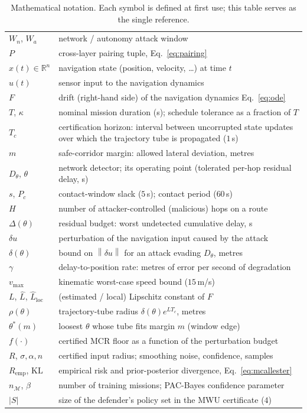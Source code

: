 \documentclass[conference,letterpaper,10pt]{IEEEtran}   %
\newcommand{\Real}{\mathbb{R}}
\newcommand{\Norm}[1]{\left\lVert #1\right\rVert}
\begin{document}
\begin{table}[t]
\centering
\caption{Mathematical notation. Each symbol is defined at first use; this
table serves as the single reference.}
\label{tab:notation}
\small
\renewcommand{\arraystretch}{1.05}
\begin{tabularx}{\columnwidth}{@{}lX@{}}
\toprule
$W_n$, $W_a$ & network / autonomy attack window\\
$P$ & cross-layer pairing tuple, Eq.~\eqref{eq:pairing}\\
$x(t)\in\Real^n$ & navigation state (position, velocity, \dots) at time $t$\\
$u(t)$ & sensor input to the navigation dynamics\\
$F$ & drift (right-hand side) of the navigation dynamics Eq.~\eqref{eq:ode}\\
$T$, $\kappa$ & nominal mission duration (s); schedule tolerance as a
fraction of $T$\\
$T_c$ & certification horizon: interval between uncorrupted state updates
over which the trajectory tube is propagated ($1$\,s)\\
$m$ & safe-corridor margin: allowed lateral deviation, metres\\
$D_\theta$, $\theta$ & network detector; its operating point
(tolerated per-hop residual delay, s)\\
$s$, $P_{\!c}$ & contact-window slack ($5$\,s); contact period ($60$\,s)\\
$H$ & number of attacker-controlled (malicious) hops on a route\\
$\Delta(\theta)$ & residual budget: worst undetected cumulative delay, s\\
$\delta u$ & perturbation of the navigation input caused by the attack\\
$\delta(\theta)$ & bound on $\Norm{\delta u}$ for an attack evading $D_\theta$, metres\\
$\gamma$ & delay-to-position rate: metres of error per second of degradation\\
$v_{\max}$ & kinematic worst-case speed bound ($15$\,m/s)\\
$L$, $\hat L$, $\hat L_{\mathrm{loc}}$ & (estimated / local) Lipschitz constant of $F$\\
$\rho(\theta)$ & trajectory-tube radius $\delta(\theta)e^{LT_c}$, metres\\
$\theta^{*}(m)$ & loosest $\theta$ whose tube fits margin $m$ (window edge)\\
$f(\cdot)$ & certified MCR floor as a function of the perturbation budget\\
$R$, $\sigma,\alpha,n$ & certified input radius; smoothing noise, confidence, samples\\
$R_{\mathrm{emp}}$, $\mathrm{KL}$ & empirical risk and prior-posterior divergence, Eq.~\eqref{eq:mcallester}\\
$n_{\mathcal{M}}$, $\beta$ & number of training missions; PAC-Bayes confidence parameter\\
$|S|$ & size of the defender's policy set in the MWU certificate ($4$)\\
\bottomrule
\end{tabularx}
\end{table}
\end{document}
